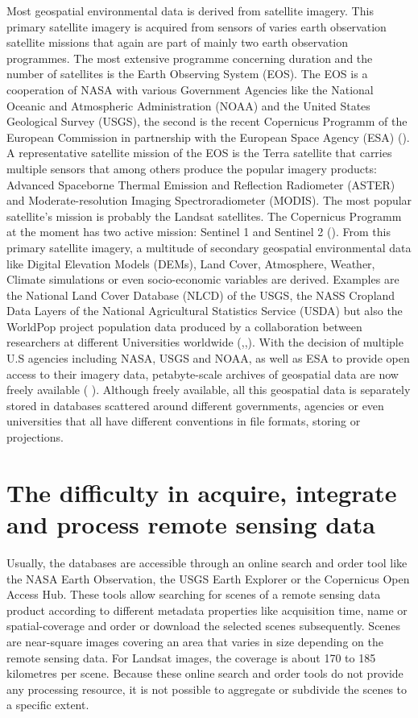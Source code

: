 \documentclass[12pt,twoside,a4paper,final]{report}
\begin{document}
Most geospatial environmental data is derived from satellite imagery. This primary satellite imagery is acquired from sensors of varies earth observation satellite missions that again are part of mainly two earth observation programmes. The most extensive programme concerning duration and the number of satellites is the Earth Observing System (EOS). The EOS is a cooperation of NASA with various Government Agencies like the National Oceanic and Atmospheric Administration (NOAA) and the United States Geological Survey (USGS), the second is the recent Copernicus Programm of the European Commission in partnership with the European Space Agency (ESA) (\cite{salomonson2002overview}). A representative satellite mission of the EOS is the Terra satellite that carries multiple sensors that among others produce the popular imagery products: Advanced Spaceborne Thermal Emission and Reflection Radiometer (ASTER) and Moderate-resolution Imaging Spectroradiometer (MODIS). The most popular satellite's mission is probably the Landsat satellites. The Copernicus Programm at the moment has two active mission: Sentinel 1 and Sentinel 2 (\cite{butler2014earth}).
From this primary satellite imagery, a multitude of secondary geospatial environmental data like Digital Elevation Models (DEMs), Land Cover, Atmosphere, Weather, Climate simulations or even socio-economic variables are derived. Examples are the National Land Cover Database (NLCD) of the USGS, the NASS Cropland Data Layers of the National Agricultural Statistics Service (USDA) but also the WorldPop project population data produced by a collaboration between researchers at different Universities worldwide (\cite{homer2007completion},\cite{johnson20102009},\cite{tatem2017worldpop}). 
With the decision of multiple U.S agencies including NASA, USGS and NOAA, as well as ESA to provide open access to their imagery data, petabyte-scale archives of geospatial data are now freely available (\cite{gorelick2017google} ).
Although freely available, all this geospatial data is separately stored in databases scattered around different governments, agencies or even universities that all have different conventions in file formats, storing or projections. 

\section{The difficulty in acquire, integrate and process remote sensing data}

Usually, the databases are accessible through an online search and order tool like the NASA Earth Observation, the USGS Earth Explorer or the Copernicus Open Access Hub. These tools allow searching for scenes of a remote sensing data product according to different metadata properties like acquisition time, name or spatial-coverage and order or download the selected scenes subsequently. 
Scenes are near-square images covering an area that varies in size depending on the remote sensing data. For Landsat images, the coverage is about 170 to 185 kilometres per scene. Because these online search and order tools do not provide any processing resource, it is not possible to aggregate or subdivide the scenes to a specific extent.
\end{document}
